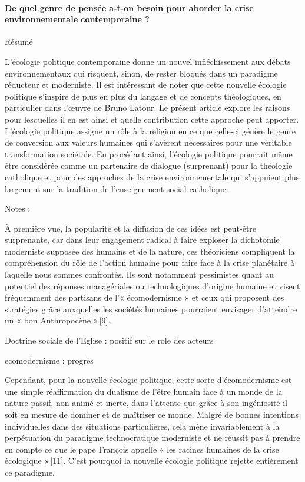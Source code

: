 \paragraph{De quel genre de pensée a-t-on besoin pour aborder la crise environnementale contemporaine ? }
        \cite{howles_quel_2022}
Résumé   	
\begin{singlequote}

L'écologie politique contemporaine donne un nouvel infléchissement aux débats environnementaux qui risquent, sinon, de rester bloqués dans un paradigme réducteur et moderniste. Il est intéressant de noter que cette nouvelle écologie politique s'inspire de plus en plus du langage et de concepts théologiques, en particulier dans l'œuvre de Bruno Latour. Le présent article explore les raisons pour lesquelles il en est ainsi et quelle contribution cette approche peut apporter. L'écologie politique assigne un rôle à la religion en ce que celle-ci génère le genre de conversion aux valeurs humaines qui s'avèrent nécessaires pour une véritable transformation sociétale. En procédant ainsi, l'écologie politique pourrait même être considérée comme un partenaire de dialogue (surprenant) pour la théologie catholique et pour des approches de la crise environnementale qui s'appuient plus largement sur la tradition de l'enseignement social catholique.
\end{singlequote}
 
Notes :

\begin{singlequote}

        À première vue, la popularité et la diffusion de ces idées est peut-être surprenante, car dans leur engagement radical à faire exploser la dichotomie moderniste supposée des humains et de la nature, ces théoriciens compliquent la compréhension du rôle de l’action humaine pour faire face à la crise planétaire à laquelle nous sommes confrontés. Ils sont notamment pessimistes quant au potentiel des réponses managériales ou technologiques d’origine humaine et visent fréquemment des partisans de l’« écomodernisme » et ceux qui proposent des stratégies grâce auxquelles les sociétés humaines pourraient envisager d’atteindre un « bon Anthropocène » [9]. 
\end{singlequote}

        Doctrine sociale de l’Eglise : positif sur le role des acteurs

        ecomodernisme : progrès
\begin{singlequote}

        Cependant, pour la nouvelle écologie politique, cette sorte d’écomodernisme est une simple réaffirmation du dualisme de l’être humain face à un monde de la nature passif, non animé et inerte, dans l’attente que grâce à son ingéniosité il soit en mesure de dominer et de maîtriser ce monde. Malgré de bonnes intentions individuelles dans des situations particulières, cela mène invariablement à la perpétuation du paradigme technocratique moderniste et ne réussit pas à prendre en compte ce que le pape François appelle « les racines humaines de la crise écologique » [11]. C’est pourquoi la nouvelle écologie politique rejette entièrement ce paradigme.
\end{singlequote}

